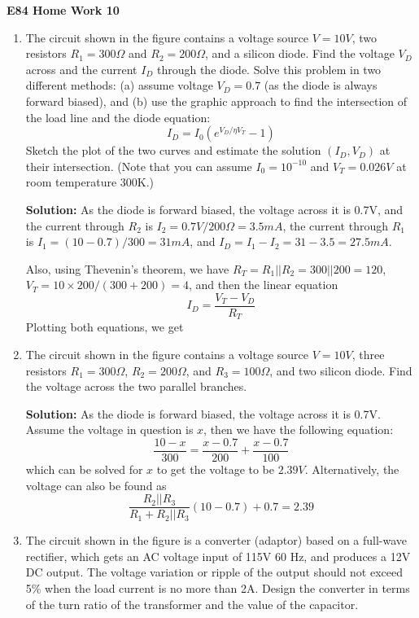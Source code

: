 \usepackage{html}

\begin{center}
{\Large \bf E84 Home Work 10}
\end{center}
\begin{enumerate}

\item The circuit shown in the figure contains a voltage source $V=10V$,
two resistors $R_1=300\Omega$ and $R_2=200\Omega$, and a silicon diode.
Find the voltage $V_D$ across and the current $I_D$ through the diode.
Solve this problem in two different methods: (a) assume voltage $V_D=0.7$ 
(as the diode is always forward biased), and (b) use the graphic approach
to find the intersection of the load line and the diode equation:
\[ I_D=I_0 ( e^{V_D/\eta V_T}-1 ) \]
Sketch the plot of the two curves and estimate the solution $(I_D,V_D)$
at their intersection. (Note that you can assume $I_0=10^{-10}$ and 
$V_T=0.026V$ at room temperature 300K.)


{\bf Solution:} As the diode is forward biased, the voltage across it
is 0.7V, and the current through $R_2$ is $I_2=0.7V/200\Omega=3.5mA$, 
the current through $R_1$ is $I_1=(10-0.7)/300=31 mA$, and 
$I_D=I_1-I_2=31-3.5=27.5 mA$.

Also, using Thevenin's theorem, we have $R_T=R_1||R_2=300||200=120$, 
$V_T=10\times 200/(300+200)=4$, and then the linear equation
\[
I_D=\frac{V_T-V_D}{R_T}
\]
Plotting both equations, we get


\item The circuit shown in the figure contains a voltage source $V=10V$,
three resistors $R_1=300\Omega$, $R_2=200\Omega$, and $R_3=100\Omega$, 
and two silicon diode. Find the voltage across the two parallel branches.


{\bf Solution:} As the diode is forward biased, the voltage across it
is 0.7V. Assume the voltage in question is $x$, then we have the following
equation:
\[
\frac{10-x}{300}=\frac{x-0.7}{200}+\frac{x-0.7}{100}	
\]
which can be solved for $x$ to get the voltage to be $2.39V$.
Alternatively, the voltage can also be found as
\[
\frac{R_2||R_3}{R_1+R_2||R_3}(10-0.7)+0.7=2.39
\]

\item The circuit shown in the figure is a converter (adaptor) based on
a full-wave rectifier, which gets an AC voltage input of 115V 60 Hz, and
produces a 12V DC output. The voltage variation or ripple of the output
should not exceed 5\% when the load current is no more than 2A. Design 
the converter in terms of the turn ratio of the transformer and the 
value of the capacitor. 


\end{enumerate}
